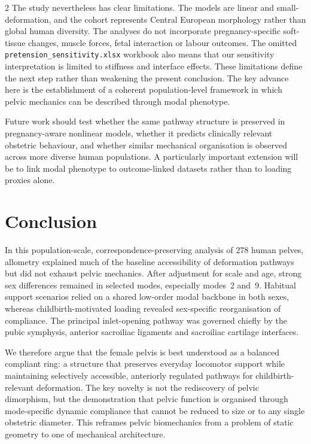 \documentclass[openacc]{rsproca_new}
\begin{document}
\begin{multicols}{2}
The study nevertheless has clear limitations. The models are linear and small-deformation, and the cohort represents Central European morphology rather than global human diversity. The analyses do not incorporate pregnancy-specific soft-tissue changes, muscle forces, fetal interaction or labour outcomes. The omitted \texttt{pretension\_sensitivity.xlsx} workbook also means that our sensitivity interpretation is limited to stiffness and interface effects. These limitations define the next step rather than weakening the present conclusion. The key advance here is the establishment of a coherent population-level framework in which pelvic mechanics can be described through modal phenotype.

Future work should test whether the same pathway structure is preserved in pregnancy-aware nonlinear models, whether it predicts clinically relevant obstetric behaviour, and whether similar mechanical organisation is observed across more diverse human populations. A particularly important extension will be to link modal phenotype to outcome-linked datasets rather than to loading proxies alone.

\section{Conclusion}

In this population-scale, correspondence-preserving analysis of 278 human pelves, allometry explained much of the baseline accessibility of deformation pathways but did not exhaust pelvic mechanics. After adjustment for scale and age, strong sex differences remained in selected modes, especially modes~2 and~9. Habitual support scenarios relied on a shared low-order modal backbone in both sexes, whereas childbirth-motivated loading revealed sex-specific reorganisation of compliance. The principal inlet-opening pathway was governed chiefly by the pubic symphysis, anterior sacroiliac ligaments and sacroiliac cartilage interfaces.

We therefore argue that the female pelvis is best understood as a balanced compliant ring: a structure that preserves everyday locomotor support while maintaining selectively accessible, anteriorly regulated pathways for childbirth-relevant deformation. The key novelty is not the rediscovery of pelvic dimorphism, but the demonstration that pelvic function is organised through mode-specific dynamic compliance that cannot be reduced to size or to any single obstetric diameter. This reframes pelvic biomechanics from a problem of static geometry to one of mechanical architecture.


\end{multicols}
\end{document}
